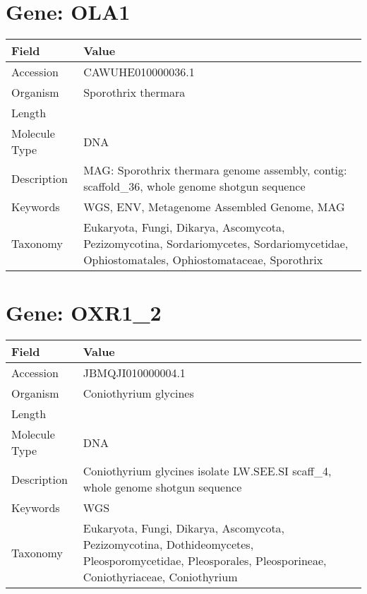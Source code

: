 \documentclass[10pt]{article}
\begin{document}
\section{Gene: OLA1}
{\footnotesize
\begin{longtable}{>{\raggedright\arraybackslash}p{4.5cm} >{\raggedright\arraybackslash}p{11.5cm}}
\textbf{Field} & \textbf{Value} \\
\hline
Accession & CAWUHE010000036.1 \\
Organism & Sporothrix thermara \\
Length & 285080 \\
Molecule Type & DNA \\
Description & MAG: Sporothrix thermara genome assembly, contig: scaffold\_36, whole genome shotgun sequence \\
Keywords & WGS, ENV, Metagenome Assembled Genome, MAG \\
Taxonomy & Eukaryota, Fungi, Dikarya, Ascomycota, Pezizomycotina, Sordariomycetes, Sordariomycetidae, Ophiostomatales, Ophiostomataceae, Sporothrix \\
\end{longtable}
}

\vspace{1em}
\section{Gene: OXR1\_2}
{\footnotesize
\begin{longtable}{>{\raggedright\arraybackslash}p{4.5cm} >{\raggedright\arraybackslash}p{11.5cm}}
\textbf{Field} & \textbf{Value} \\
\hline
Accession & JBMQJI010000004.1 \\
Organism & Coniothyrium glycines \\
Length & 713357 \\
Molecule Type & DNA \\
Description & Coniothyrium glycines isolate LW.SEE.SI scaff\_4, whole genome shotgun sequence \\
Keywords & WGS \\
Taxonomy & Eukaryota, Fungi, Dikarya, Ascomycota, Pezizomycotina, Dothideomycetes, Pleosporomycetidae, Pleosporales, Pleosporineae, Coniothyriaceae, Coniothyrium \\
\end{longtable}
}

\vspace{1em}
\end{document}
